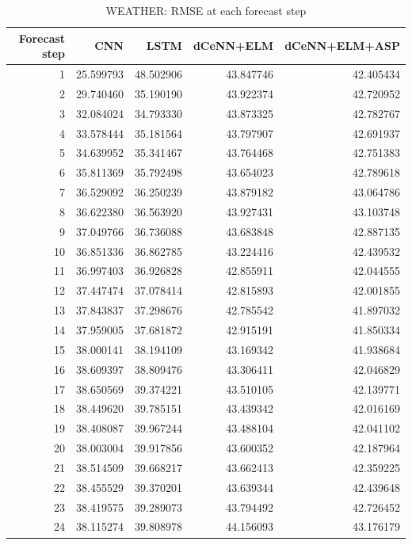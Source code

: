 \begin{table}
\caption{WEATHER: RMSE at each forecast step}
\begin{tabular}{rrrrr}
\toprule
Forecast step & CNN & LSTM & dCeNN+ELM & dCeNN+ELM+ASP \\
\midrule
1 & 25.599793 & 48.502906 & 43.847746 & 42.405434 \\
2 & 29.740460 & 35.190190 & 43.922374 & 42.720952 \\
3 & 32.084024 & 34.793330 & 43.873325 & 42.782767 \\
4 & 33.578444 & 35.181564 & 43.797907 & 42.691937 \\
5 & 34.639952 & 35.341467 & 43.764468 & 42.751383 \\
6 & 35.811369 & 35.792498 & 43.654023 & 42.789618 \\
7 & 36.529092 & 36.250239 & 43.879182 & 43.064786 \\
8 & 36.622380 & 36.563920 & 43.927431 & 43.103748 \\
9 & 37.049766 & 36.736088 & 43.683848 & 42.887135 \\
10 & 36.851336 & 36.862785 & 43.224416 & 42.439532 \\
11 & 36.997403 & 36.926828 & 42.855911 & 42.044555 \\
12 & 37.447474 & 37.078414 & 42.815893 & 42.001855 \\
13 & 37.843837 & 37.298676 & 42.785542 & 41.897032 \\
14 & 37.959005 & 37.681872 & 42.915191 & 41.850334 \\
15 & 38.000141 & 38.194109 & 43.169342 & 41.938684 \\
16 & 38.609397 & 38.809476 & 43.306411 & 42.046829 \\
17 & 38.650569 & 39.374221 & 43.510105 & 42.139771 \\
18 & 38.449620 & 39.785151 & 43.439342 & 42.016169 \\
19 & 38.408087 & 39.967244 & 43.488104 & 42.041102 \\
20 & 38.003004 & 39.917856 & 43.600352 & 42.187964 \\
21 & 38.514509 & 39.668217 & 43.662413 & 42.359225 \\
22 & 38.455529 & 39.370201 & 43.639344 & 42.439648 \\
23 & 38.419575 & 39.289073 & 43.794492 & 42.726452 \\
24 & 38.115274 & 39.808978 & 44.156093 & 43.176179 \\
\bottomrule
\end{tabular}
\end{table}
